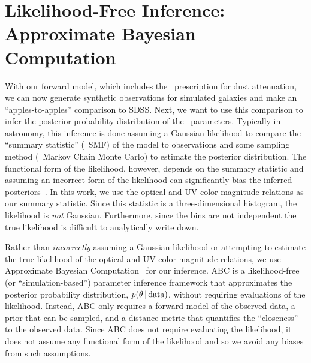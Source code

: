\section{Likelihood-Free Inference: Approximate Bayesian Computation} \label{sec:abc}
With our forward model, which includes the \eda~prescription for dust
attenuation, we can now generate synthetic observations for simulated
galaxies and make an ``apples-to-apples'' comparison to SDSS. Next, we want
to use this comparison to infer the posterior probability distribution of
the \eda~parameters. Typically in astronomy, this inference is done
assuming a Gaussian likelihood to compare the ``summary statistic''
(\eg~SMF) of the model to observations and some sampling method (\eg~Markov
Chain Monte Carlo) to estimate the posterior distribution. The functional form of the
likelihood, however, depends on the summary statistic and assuming an
incorrect form of the likelihood can significantly bias the inferred
posteriors~\citep[\eg][]{hahn2019}. In this work, we use the optical and UV
color-magnitude relations as our summary statistic. Since this statistic is
a three-dimensional histogram, the likelihood is {\em not} Gaussian.
Furthermore, since the bins are not independent the true likelihood is
difficult to analytically write down.

Rather than \emph{incorrectly} assuming a Gaussian likelihood or attempting
to estimate the true likelihood of the optical and UV color-magnitude
relations, we use Approximate Bayesian Computation~\citep[hereafter
ABC;][]{diggle1984, tavare1997, pritchard1999, beaumont2009, delmoral2012}
for our inference. 
ABC is a likelihood-free (or ``simulation-based'') parameter inference
framework that approximates the posterior probability distribution, $p(\theta\,|\,{\rm data})$, without
requiring evaluations of the likelihood.  Instead, ABC only requires a forward
model of the observed data, a prior that can be sampled, and a distance metric
that quantifies the ``closeness'' to the observed data. 
Since ABC does not require evaluating the likelihood, it does not assume
any functional form of the likelihood and so we avoid any biases from such
assumptions. 

